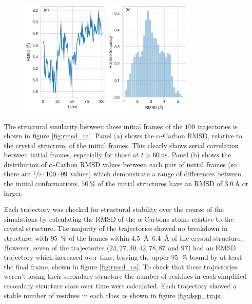 \begin{figure}
    \centering
    \includegraphics[width=0.8\textwidth]{chapters/aadh/figures/rmsd_seed_trajectory.png}
    \label{fig:rmsd_seed_traj}
\end{figure}

 The structural similarity between these initial frames of the $100$ trajectories is shown in figure \ref{fig:rmsd_ca}. Panel (a)  shows the $\alpha$-Carbon RMSD, relative to the crystal structure, of the initial frames. This clearly shows serial correlation between initial frames, especially for those at $t>\SI{60}{\nano\second}$. Panel (b) shows the distribution of $\alpha$-Carbon RMSD values between each pair of initial frames (so there are $\sfrac{1}{2}\cdot 100\cdot 99$ values) which demonstrate a range of differences between the initial conformations. $\SI{50}{\percent}$ of the initial structures have an RMSD of $\SI{3.0}{\angstrom}$ or larger.  

Each trajectory was checked for structural stability over the course of the simulations by calculating the RMSD of the $\alpha$-Carbons atoms relative to the crystal structure. The majority of the trajectories showed no breakdown in structure, with  \SI{95}{\percent} of the frames within \SIrange{4.5}{6.4}{\angstrom} of the crystal structure. However, seven of the trajectories ($24, 27, 30, 42, 78, 87$ and $97$) had an RMSD trajectory which increased over time, leaving the upper \SI{95}{\percent} bound by at least the final frame, shown in figure \ref{fig:rmsd_ca}. To check that these trajectories weren't losing their secondary structure the number of residues in each simplified secondary structure class \cite{kabschDictionaryProteinSecondary1983} over time were calculated. Each trajectory showed a stable number of residues in each class as shown in figure \ref{fig:dssp_trajs}.

